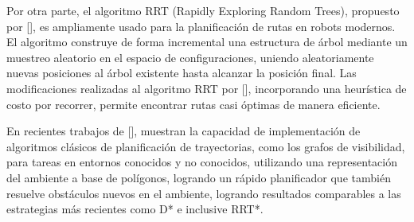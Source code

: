 
Por otra parte, el algoritmo RRT (Rapidly Exploring Random Trees), propuesto por \citeauthor{LaValle1998RapidlyexploringRT}[], es ampliamente usado para la planificaci\'{o}n de rutas en robots modernos. El algoritmo construye de forma incremental una estructura de \'{a}rbol mediante un muestreo aleatorio en el espacio de configuraciones, uniendo aleatoriamente nuevas posiciones al \'{a}rbol existente hasta alcanzar la posición final. Las modificaciones realizadas al algoritmo RRT por \citeauthor{Karaman2011}[], incorporando una heur\'{i}stica de costo por recorrer, permite encontrar rutas casi \'{o}ptimas de manera eficiente.

En recientes trabajos de \citeauthor{yang2022far}[], muestran la capacidad de implementaci\'{o}n de algoritmos clásicos de planificación de trayectorias, como los grafos de visibilidad, para tareas en entornos conocidos y no conocidos, utilizando una representaci\'{o}n del ambiente a base de polígonos, logrando un r\'{a}pido planificador que tambi\'{e}n resuelve obst\'{a}culos nuevos en el ambiente, logrando resultados comparables a las estrategias más recientes como D* e inclusive RRT*.


